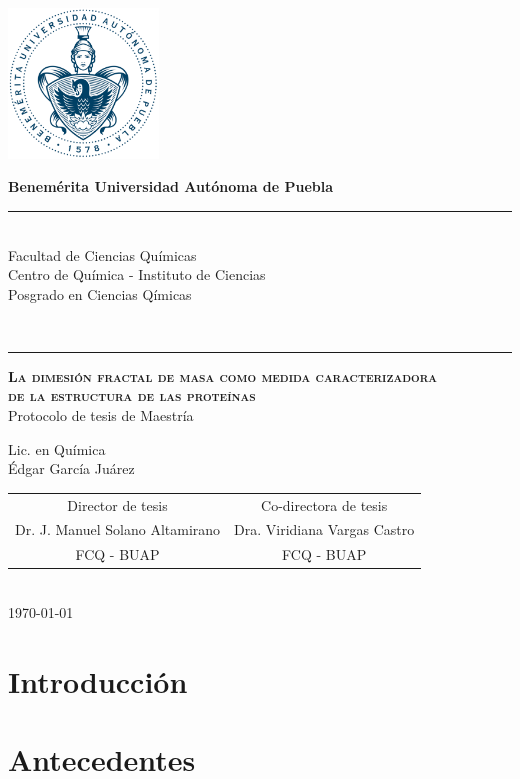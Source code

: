 \documentclass[11pt]{article}
\newcommand\vtab[1][0.5cm]{\vspace*{#1}}
\begin{document}
\pagestyle{empty} 
\phantom{a}
\vspace{-1.4cm}
\begin{center}
\includegraphics[width=4cm]{buap.pdf}

\Large{\textbf{Benemérita Universidad Autónoma de Puebla}\\
\rule{150mm}{0.1mm}\\
Facultad de Ciencias Químicas\\
Centro de Química - Instituto de Ciencias\\
Posgrado en Ciencias Qímicas}\\
\rule{150mm}{0.1mm}

\vtab[.1cm]
{\scshape\large \textbf{La dimesión fractal  de masa como medida caracterizadora\\de la estructura de las proteínas}}\\
\vtab[.1cm]
\Large{Protocolo de tesis de Maestría}\\
\vtab[0.2cm]

Lic. en Química \\
Édgar García Juárez \\
\vtab[0.5cm]
\begin{tabular}{cc}
\vtab[10mm]
Director de tesis & Co-directora de tesis \\
Dr. J. Manuel Solano Altamirano & Dra. Viridiana Vargas Castro \\ 
FCQ - BUAP & FCQ - BUAP \\ 
\end{tabular} 
\vtab[1cm] \\
{\today}
\end{center}

\clearpage

\section{Introducción}


\section{Antecedentes}
\end{document}
